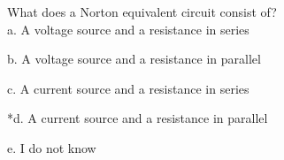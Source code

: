 
What does a Norton equivalent circuit consist of? \\

a. A voltage source and a resistance in series

b. A voltage source and a resistance in parallel

c. A current source and a resistance in series

*d. A current source and a resistance in parallel

e. I do not know \\
